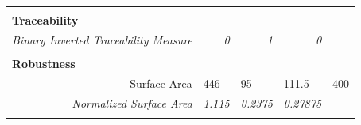 \documentclass[12pt]{article}
\begin{document}
\begin{table}[h]
{\begin{tabular}{rllll}
\multicolumn{1}{l}{}                           &                                                                   &                                                                   &                                                                   &                           \\
\multicolumn{1}{l}{\textbf{Traceability}}      &                                                                   &                                                                   &                                                                   &                           \\ \cline{1-1}
\rowcolor[HTML]{C0C0C0} 
\textit{Binary Inverted Traceability Measure}           & \multicolumn{1}{r}{\cellcolor[HTML]{C0C0C0}\textit{0}}            & \multicolumn{1}{r}{\cellcolor[HTML]{C0C0C0}\textit{1}}            & \multicolumn{1}{r}{\cellcolor[HTML]{C0C0C0}\textit{0}}            &                          \\
\multicolumn{1}{l}{}                           &                                                                   &                                                                   &                                                                   &                           \\
\multicolumn{1}{l}{\textbf{Robustness}}        &                                                                   &                                                                   &                                                                   &                           \\ \cline{1-1}
Surface Area                                   & 446                                                               & 95                                                                & 111.5                                                             & 400                       \\
\rowcolor[HTML]{C0C0C0} 
\textit{Normalized Surface Area}               & \multicolumn{1}{r}{\cellcolor[HTML]{C0C0C0}\textit{1.115}}        & \multicolumn{1}{r}{\cellcolor[HTML]{C0C0C0}\textit{0.2375}}       & \multicolumn{1}{r}{\cellcolor[HTML]{C0C0C0}\textit{0.27875}}      & \textit{}                 \\
\multicolumn{1}{l}{}                           &                                                                   &                                                                   &                                                                   &                           \\

\end{tabular}}
\end{table}
\end{document}
